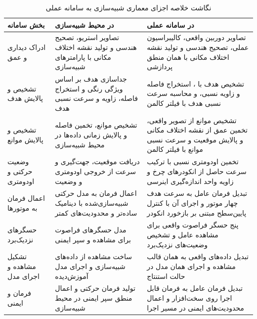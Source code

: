 \begin{table}[htb]
	\centering
	\caption{نگاشت خلاصه اجزای معماری شبیه‌سازی به سامانه عملی}
	\label{tab:sim_real_mapping_updated}
	\renewcommand{\arraystretch}{1.18}
	\begin{tabular}{|p{}|p{}|p{}|}
		\hline
		\textbf{بخش سامانه} &
		\textbf{در محیط شبیه‌سازی} &
		\textbf{در سامانه عملی} \\
		\hline
	
		ادراک دیداری و عمق &
		تصاویر استریو، تصحیح هندسی و تولید نقشه اختلاف مکانی با پارامترهای شبیه‌سازی &
		تصاویر دوربین واقعی، کالیبراسیون عملی، تصحیح هندسی و تولید نقشه اختلاف مکانی با همان منطق پردازشی \\
		\hline
		
		تشخیص و پالایش هدف &
		جداسازی هدف بر اساس ویژگی رنگی و استخراج فاصله، زاویه و سرعت نسبی هدف &
		تشخیص هدف با \lr{AprilTag}، استخراج فاصله و زاویه نسبی، و محاسبه سرعت نسبی هدف با فیلتر کالمن \\
		\hline
		
		تشخیص و پالایش موانع &
		تشخیص موانع، تخمین فاصله و پالایش زمانی داده‌ها در محیط شبیه‌سازی &
		تشخیص موانع از تصویر واقعی، تخمین عمق از نقشه اختلاف مکانی و پالایش موقعیت و سرعت نسبی موانع با فیلتر کالمن \\
		\hline
		
		وضعیت حرکتی و اودومتری &
		دریافت موقعیت، جهت‌گیری و سرعت از خروجی اودومتری و وضعیت \lr{Gazebo} &
		تخمین اودومتری نسبی با ترکیب سرعت حاصل از انکودرهای چرخ و زاویه \lr{yaw} واحد اندازه‌گیری اینرسی \\
		\hline
		
		اعمال فرمان به موتورها &
		اعمال فرمان به مدل حرکتی شبیه‌سازی‌شده با دینامیک ساده‌تر و محدودیت‌های کمتر &
		تبدیل فرمان عامل به سرعت هدف چهار موتور و اجرای آن با کنترل پایین‌سطح مبتنی بر بازخورد انکودر \\
		\hline
		
		حسگرهای نزدیک‌برد &
		مدل حسگرهای فراصوت برای مشاهده و سپر ایمنی &
		پنج حسگر فراصوت واقعی برای مشاهده عامل و تشخیص وضعیت‌های نزدیک‌برد \\
		\hline
		
		تشکیل مشاهده و اجرای مدل &
		ساخت مشاهده از داده‌های شبیه‌سازی و اجرای مدل آموزش‌دیده &
		تبدیل داده‌های واقعی به همان قالب مشاهده و اجرای همان مدل \lr{LSTM-SAC} در حالت استنتاج \\
		\hline
		
		فرمان و ایمنی &
		تولید فرمان حرکتی و اعمال منطق سپر ایمنی در محیط شبیه‌سازی &
		تبدیل فرمان عامل به فرمان قابل اجرا روی سخت‌افزار و اعمال محدودیت‌های ایمنی در مسیر اجرا \\
		\hline
		
	\end{tabular}

	
\end{table}

